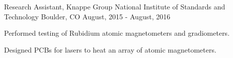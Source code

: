 \begin{cventries}
  \cventry
    {Research Assistant, Knappe Group} %
    {National Institute of Standards and Technology} %
    {Boulder, CO} %
    {August, 2015 - August, 2016} %
    {
      \begin{cvitems} %
        \item {Performed testing of Rubidium atomic magnetometers and
          gradiometers.}
        \item {Designed PCBs for lasers to heat an array of atomic
          magnetometers.}
      \end{cvitems}
    }
\end{cventries}
